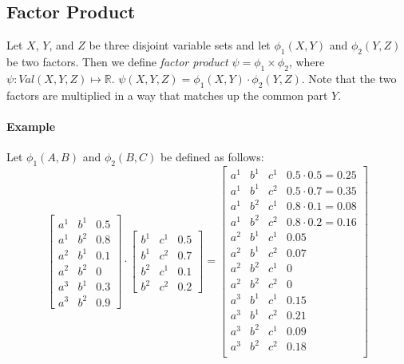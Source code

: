\subsection {Factor Product}
Let $X$, $Y$, and $Z$ be three disjoint variable sets and let $\phi_1(X,Y)$ and $\phi_2(Y,Z)$ be two factors.  Then we define \emph{factor product} $\psi = \phi_1 \times \phi_2$, where $\psi:Val(X,Y,Z) \mapsto \mathbb{R}$.   $\psi(X,Y,Z)  = \phi_1(X,Y) \cdot \phi_2(Y,Z)$.  Note that the two factors are multiplied in a way that matches up the common part $Y$. 
\paragraph{Example} Let $\phi_1(A,B)$ and $\phi_2(B,C)$ be defined as follows:
\[
\begin{bmatrix}
a^1 & b^1 & 0.5 \\
a^1 & b^2 & 0.8 \\
a^2 & b^1 & 0.1 \\
a^2 & b^2 & 0 \\
a^3 & b^1 & 0.3 \\
a^3 & b^2 & 0.9
\end{bmatrix}
\cdot
\begin{bmatrix}
b^1 & c^1 & 0.5\\
b^1 & c^2 & 0.7\\
b^2 & c^1 & 0.1\\
b^2 & c^2 & 0.2
\end{bmatrix}
=
\begin{bmatrix}
a^1 & b^1 & c^1 & 0.5\cdot0.5=0.25 \\
a^1 & b^1 & c^2 & 0.5\cdot0.7=0.35 \\
a^1 & b^2 & c^1 & 0.8\cdot0.1=0.08\\
a^1 & b^2 & c^2 & 0.8\cdot0.2=0.16\\

a^2 & b^1 & c^1 & 0.05\\
a^2 & b^1 & c^2 & 0.07\\
a^2 & b^2 & c^1 & 0\\
a^2 & b^2 & c^2 & 0\\

a^3 & b^1 & c^1 & 0.15\\
a^3 & b^1 & c^2 & 0.21\\
a^3 & b^2 & c^1 & 0.09\\
a^3 & b^2 & c^2 & 0.18\\


\end{bmatrix}
\]

